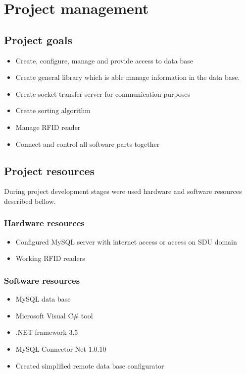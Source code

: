 %
\section{Project management}

\subsection{Project goals}

\begin{itemize}
	\item Create, configure, manage and provide access to data base
	\item Create general library which is able manage information in the data base.
	\item Create socket transfer server for communication purposes
	\item Create sorting algorithm
	\item Manage RFID reader
	\item Connect and control all software parts together
\end{itemize}

\subsection{Project resources}

During project development stages were used hardware and software resources described bellow.

\subsubsection{Hardware resources}
\begin{itemize}
	\item Configured MySQL server with internet access or access on SDU domain
	\item Working RFID readers
\end{itemize}

\subsubsection{Software resources}
\begin{itemize}
	\item MySQL data base
	\item Microsoft Visual C\# tool
	\item .NET framework 3.5
	\item MySQL Connector Net 1.0.10
	\item Created simplified remote data base configurator
\end{itemize}

